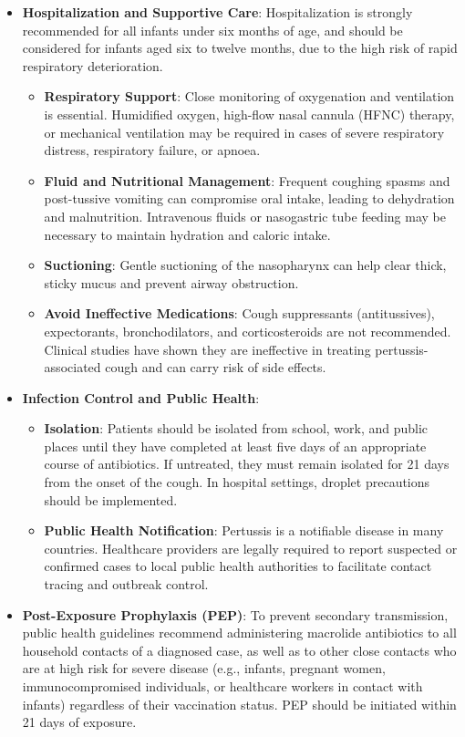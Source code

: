 \begin{itemize}
    \item \textbf{Hospitalization and Supportive Care}: Hospitalization is strongly recommended for all infants under six months of age, and should be considered for infants aged six to twelve months, due to the high risk of rapid respiratory deterioration.
    \begin{itemize}
        \item \textbf{Respiratory Support}: Close monitoring of oxygenation and ventilation is essential. Humidified oxygen, high-flow nasal cannula (HFNC) therapy, or mechanical ventilation may be required in cases of severe respiratory distress, respiratory failure, or apnoea.
        \item \textbf{Fluid and Nutritional Management}: Frequent coughing spasms and post-tussive vomiting can compromise oral intake, leading to dehydration and malnutrition. Intravenous fluids or nasogastric tube feeding may be necessary to maintain hydration and caloric intake.
        \item \textbf{Suctioning}: Gentle suctioning of the nasopharynx can help clear thick, sticky mucus and prevent airway obstruction.
        \item \textbf{Avoid Ineffective Medications}: Cough suppressants (antitussives), expectorants, bronchodilators, and corticosteroids are not recommended. Clinical studies have shown they are ineffective in treating pertussis-associated cough and can carry risk of side effects.
    \end{itemize}

    \item \textbf{Infection Control and Public Health}:
    \begin{itemize}
        \item \textbf{Isolation}: Patients should be isolated from school, work, and public places until they have completed at least five days of an appropriate course of antibiotics. If untreated, they must remain isolated for 21 days from the onset of the cough. In hospital settings, droplet precautions should be implemented.
        \item \textbf{Public Health Notification}: Pertussis is a notifiable disease in many countries. Healthcare providers are legally required to report suspected or confirmed cases to local public health authorities to facilitate contact tracing and outbreak control.
    \end{itemize}

    \item \textbf{Post-Exposure Prophylaxis (PEP)}: To prevent secondary transmission, public health guidelines recommend administering macrolide antibiotics to all household contacts of a diagnosed case, as well as to other close contacts who are at high risk for severe disease (e.g., infants, pregnant women, immunocompromised individuals, or healthcare workers in contact with infants) regardless of their vaccination status. PEP should be initiated within 21 days of exposure.
\end{itemize}

